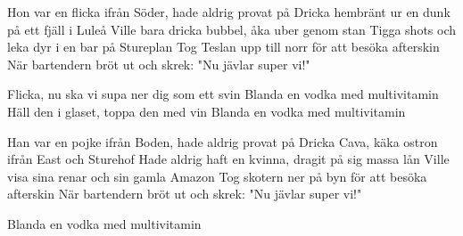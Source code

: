 \medskip

\begin{guitar}
  Hon var en flicka ifrån Söder, hade aldrig provat på
  Dricka hembränt ur en dunk på ett fjäll i Luleå
  Ville bara dricka bubbel, åka uber genom stan
  Tigga shots och leka dyr i en bar på Stureplan
  Tog Teslan upp till norr för att besöka afterskin
  När bartendern bröt ut och skrek: "Nu jävlar super vi!"

	\begin{highlightbar}
    Flicka, nu ska vi supa ner dig som ett svin
    Blanda en vodka med multivitamin
    Häll den i glaset, toppa den med vin
    Blanda en vodka med multivitamin
  \end{highlightbar}

	\songsection{Verse 2}
  Han var en pojke ifrån Boden, hade aldrig provat på
  Dricka Cava, käka ostron ifrån East och Sturehof
  Hade aldrig haft en kvinna, dragit på sig massa lån
  Ville visa sina renar och sin gamla Amazon
  Tog skotern ner på byn för att besöka afterskin
  När bartendern bröt ut och skrek: "Nu jävlar super vi!"

	\begin{highlightbar}
		 
  \end{highlightbar}

	\begin{highlightbar}
		 
  \end{highlightbar}

  Blanda en vodka med multivitamin
\end{guitar}
